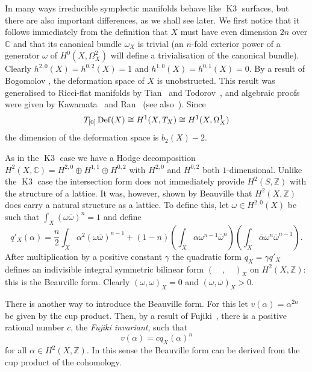 \documentclass[a4paper,11pt]{article}
\newcommand{\CC}{\mathbb C}
\newcommand{\ZZ}{\mathbb Z}
\renewcommand{\Bar}{\overline}
\newcommand{\Def}{\mathop{\null\mathrm {Def}}\nolimits}
\newcommand{\Kthree}{\mathop{\mathrm {K3}}\nolimits}
\begin{document}
In many ways irreducible symplectic manifolds behave like
$\Kthree$ surfaces, but there are also important differences, as we
shall see later. We first notice that it follows immediately from the
definition that $X$ must have even dimension $2n$ over $\CC$ and that
its canonical bundle $\omega_X$ is trivial (an $n$-fold exterior power
of a generator $\omega$ of $H^0(X,\Omega^2_X)$ will define a
trivialisation of the canonical bundle).  Clearly
$h^{2,0}(X)=h^{0,2}(X)=1$ and $h^{1,0}(X)=h^{0,1}(X)=0$. By a result
of Bogomolov \cite{Bog}, the deformation space of $X$ is
unobstructed. This result was generalised to Ricci-flat manifolds by
Tian~\cite{Ti} and Todorov~\cite{Tod}, and algebraic proofs were given
by Kawamata~\cite{Kaw} and Ran~\cite{Ran} (see also~\cite{Fuj}).
Since
\begin{equation*}
T_{[0]} \Def(X) \cong H^1(X,T_X) \cong H^1(X, \Omega^1_X)
\end{equation*}
the dimension of the deformation space is $b_2(X)-2$.

As in the $\Kthree$ case we have a Hodge decomposition $H^2(X,\CC) =
H^{2,0} \oplus H^{1,1} \oplus H^{0,2}$ with $H^{2,0}$ and $H^{0,2}$
both $1$-dimensional. Unlike the $\Kthree$ case the intersection form
does not immediately provide $H^2(S,\ZZ)$ with the structure of a
lattice. It was, however, shown by Beauville \cite{Be} that
$H^2(X,\ZZ)$ does carry a natural structure as a lattice.  To define
this, let $\omega \in H^{2,0}(X)$ be such that
$\int_X(\omega\Bar{\omega})^n=1$ and define
\begin{equation*}
q'_X(\alpha)=\frac{n}{2}\int_X\alpha^2(\omega\Bar{\omega})^{n-1} +
(1-n)\left(\int_X\alpha\omega^{n-1}\Bar{\omega}^{n}\right)
\left(\int_X\Bar{\alpha}\omega^{n}\Bar{\omega}^{n-1}\right).
\end{equation*}
After multiplication by a positive constant $\gamma$ the quadratic
form $q_X=\gamma q'_X$ defines an indivisible integral symmetric
bilinear form $(\quad ,\quad )_X$ on $H^2(X,\ZZ)$: this is the
Beauville form. Clearly $(\omega,\omega)_X=0$ and
$(\omega,\overline{\omega})_X >0$.

There is another way to introduce the Beauville form. For this let
$v(\alpha)=\alpha^{2n}$ be given by the cup product. Then, by a result
of Fujiki~\cite[Theorem 4.7]{Fuj}, there is a positive rational number
$c$, the \emph{Fujiki invariant}, such that
\begin{equation*}
v(\alpha)=cq_X(\alpha)^n
\end{equation*}
for all $\alpha \in H^2(X,\ZZ)$. In this sense the Beauville form can
be derived from the cup product of the cohomology.
\end{document}
